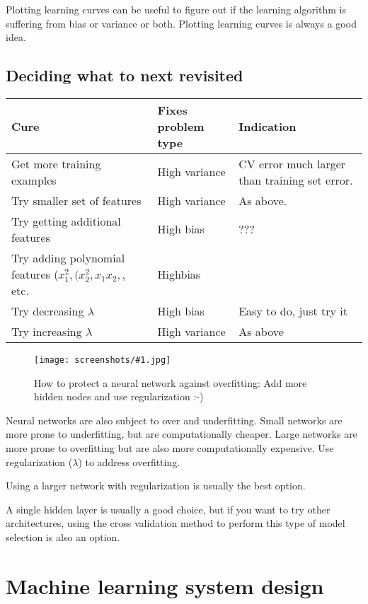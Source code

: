 \documentclass[a4, 12pt, english, USenglish]{scrreprt}
\newcommand{\screenshot}[2]{
\begin{figure}[htb]
\texttt{[image: screenshots/\#1.jpg]}
\label{#1}
\caption{#2}
\end{figure}}
\begin{document}
Plotting learning curves can be useful to figure out if the learning
algorithm is suffering from bias or variance or both.  Plotting
learning curves is always a good idea.

\section{Deciding what to  next revisited}

\begin{center}
\begin{tabular}{lll}
{\bf Cure} & {\bf Fixes problem type} & {\bf Indication}\\ \hline
Get more training examples & High variance  & CV error much larger than training set error.\\ \hline
Try smaller set of features &High variance  &  As above. \\ \hline
Try getting additional features & High bias & ???\\ \hline
Try adding polynomial features (\(x_1^2,(x_2^2, x_1x_2,\), etc. & Highbias&\\ \hline
Try decreasing \(\lambda\)& High bias & Easy to do, just try it\\ \hline
Try increasing \(\lambda\)& High variance & As above  \\ \hline
\end{tabular}
\end{center}



\screenshot{NNOverfittingprotection}{How to protect a neural network
  against overfitting: Add more hidden nodes and use regularization :-)}


Neural networks are also subject to over and underfitting.  Small
networks are more prone to underfitting, but are computationally
cheaper.   Large networks are more prone to overfitting but are also
more computationally expensive.   Use regularization (\(\lambda\)) to
address overfitting.

Using a larger network with regularization is usually the best
option.   

A single hidden layer is usually a good choice, but if you want to try
other architectures, using the cross validation method to perform this
type of model selection is also an option.


\chapter{Machine learning system design}
\end{document}
